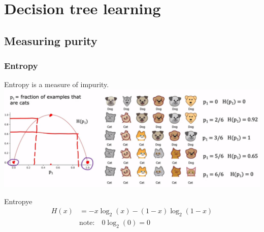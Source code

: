 \section{Decision tree learning}
\subsection*{Measuring purity}
\subsubsection*{Entropy}
Entropy is a measure of impurity.\\
\includegraphics*[width=\textwidth]{images/11.5}
\begin{thmbox}{Entropy}{e}
    \begin{align}
        H(x) &= -x\log_2(x) - (1-x)\log_2(1-x)\\
        &\text{note:} \quad 0\log_2(0) = 0 \nonumber
    \end{align}
\end{thmbox}
